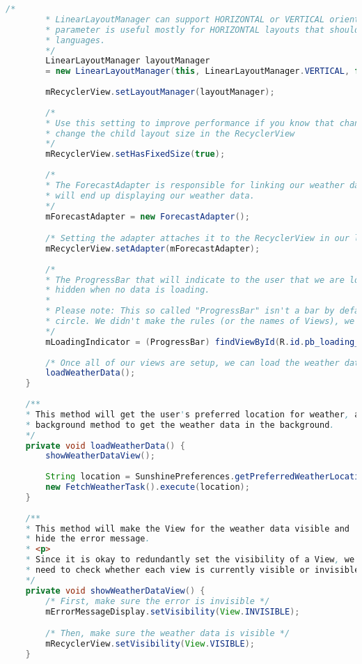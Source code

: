 \documentclass[12pt]{article} %
\begin{document}
\begin{lstlisting}[language=Java]
		/*
		* LinearLayoutManager can support HORIZONTAL or VERTICAL orientations. The reverse layout
		* parameter is useful mostly for HORIZONTAL layouts that should reverse for right to left
		* languages.
		*/
		LinearLayoutManager layoutManager
		= new LinearLayoutManager(this, LinearLayoutManager.VERTICAL, false);
		
		mRecyclerView.setLayoutManager(layoutManager);
		
		/*
		* Use this setting to improve performance if you know that changes in content do not
		* change the child layout size in the RecyclerView
		*/
		mRecyclerView.setHasFixedSize(true);
		
		/*
		* The ForecastAdapter is responsible for linking our weather data with the Views that
		* will end up displaying our weather data.
		*/
		mForecastAdapter = new ForecastAdapter();

		/* Setting the adapter attaches it to the RecyclerView in our layout. */
		mRecyclerView.setAdapter(mForecastAdapter);
		
		/*
		* The ProgressBar that will indicate to the user that we are loading data. It will be
		* hidden when no data is loading.
		*
		* Please note: This so called "ProgressBar" isn't a bar by default. It is more of a
		* circle. We didn't make the rules (or the names of Views), we just follow them.
		*/
		mLoadingIndicator = (ProgressBar) findViewById(R.id.pb_loading_indicator);
		
		/* Once all of our views are setup, we can load the weather data. */
		loadWeatherData();
	}
	
	/**
	* This method will get the user's preferred location for weather, and then tell some
	* background method to get the weather data in the background.
	*/
	private void loadWeatherData() {
		showWeatherDataView();
		
		String location = SunshinePreferences.getPreferredWeatherLocation(this);
		new FetchWeatherTask().execute(location);
	}
	
	/**
	* This method will make the View for the weather data visible and
	* hide the error message.
	* <p>
	* Since it is okay to redundantly set the visibility of a View, we don't
	* need to check whether each view is currently visible or invisible.
	*/
	private void showWeatherDataView() {
		/* First, make sure the error is invisible */
		mErrorMessageDisplay.setVisibility(View.INVISIBLE);

		/* Then, make sure the weather data is visible */
		mRecyclerView.setVisibility(View.VISIBLE);
	}
	

\end{lstlisting}
\end{document}

